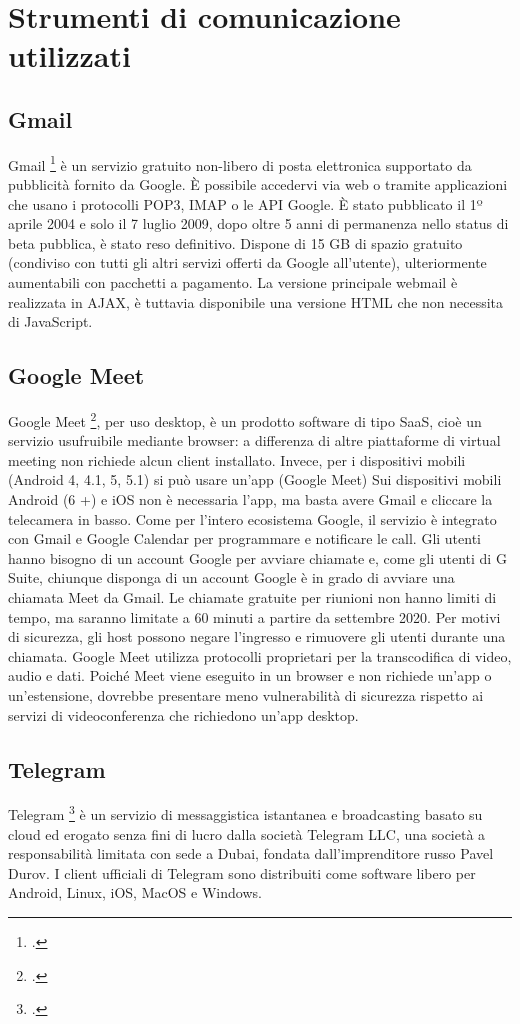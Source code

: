 \section{Strumenti di comunicazione utilizzati}
\subsection{Gmail}
Gmail \footcite{site:gmail} è un servizio gratuito non-libero di posta elettronica supportato da pubblicità fornito da Google. 
È possibile accedervi via web o tramite applicazioni che usano i protocolli POP3, IMAP o le API Google.
È stato pubblicato il 1º aprile 2004 e solo il 7 luglio 2009, dopo oltre 5 anni di permanenza nello status di beta pubblica, è stato reso definitivo.
Dispone di 15 GB di spazio gratuito (condiviso con tutti gli altri servizi offerti da Google all'utente), ulteriormente aumentabili con pacchetti a pagamento. 
La versione principale webmail è realizzata in AJAX, è tuttavia disponibile una versione HTML che non necessita di JavaScript.
\subsection{Google Meet}
Google Meet \footcite{site:meet}, per uso desktop, è un prodotto software di tipo SaaS, cioè un servizio usufruibile mediante browser: a differenza di altre piattaforme di virtual meeting non richiede alcun client installato. 
Invece, per i dispositivi mobili (Android 4, 4.1, 5, 5.1) si può usare un'app (Google Meet)
Sui dispositivi mobili Android (6 +) e iOS non è necessaria l'app, ma basta avere Gmail e cliccare la telecamera in basso. 
Come per l'intero ecosistema Google, il servizio è integrato con Gmail e Google Calendar per programmare e notificare le call.
Gli utenti hanno bisogno di un account Google per avviare chiamate e, come gli utenti di G Suite, chiunque disponga di un account Google è in grado di avviare una chiamata Meet da Gmail.
Le chiamate gratuite per riunioni non hanno limiti di tempo, ma saranno limitate a 60 minuti a partire da settembre 2020. 
Per motivi di sicurezza, gli host possono negare l'ingresso e rimuovere gli utenti durante una chiamata.
Google Meet utilizza protocolli proprietari per la transcodifica di video, audio e dati. 
Poiché Meet viene eseguito in un browser e non richiede un'app o un'estensione, dovrebbe presentare meno vulnerabilità di sicurezza rispetto ai servizi di videoconferenza che richiedono un'app desktop.
\subsection{Telegram}
Telegram \footcite{site:telegram} è un servizio di messaggistica istantanea e broadcasting basato su cloud ed erogato senza fini di lucro dalla società Telegram LLC, una società a responsabilità limitata con sede a Dubai, fondata dall'imprenditore russo Pavel Durov.
I client ufficiali di Telegram sono distribuiti come software libero per Android, Linux, iOS, MacOS e Windows.

